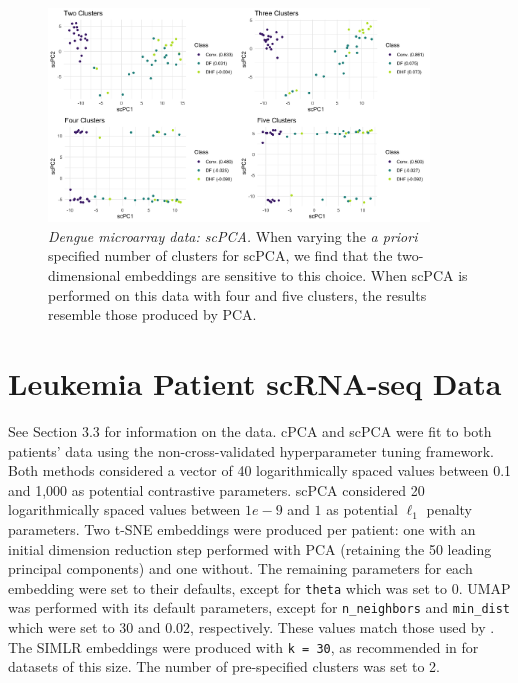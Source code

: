 \documentclass{article}
\begin{document}
\begin{figure}[!htbp]
    \centering
    \includegraphics[width=0.9\textwidth]{figures/dengue_scpca_centers}
    \caption{
    {\em Dengue microarray data: scPCA.}
    When varying the \textit{a priori} specified number of clusters for scPCA, we find that the two-dimensional embeddings are sensitive to this choice. When scPCA is performed on this data with four and five clusters, the results resemble those produced by PCA.}
    \label{fig:dengue_scpca_centers}
\end{figure}

\FloatBarrier

\newpage

\section{Leukemia Patient scRNA-seq Data}\label{sup_aml}

See Section 3.3 %
for information on the data. cPCA and scPCA were fit to both patients' data using the non-cross-validated hyperparameter tuning framework. Both methods considered a vector of 40 logarithmically spaced values between 0.1 and 1,000 as potential contrastive parameters. scPCA considered 20 logarithmically spaced values between $1e-9$ and $1$ as potential $\ell_1$ penalty parameters. Two t-SNE embeddings were produced per patient: one with an initial dimension reduction step performed with PCA (retaining the 50 leading principal components) and one without. The remaining parameters for each embedding were set to their defaults, except for \texttt{theta} which was set to 0. UMAP was performed with its default parameters, except for \texttt{n\_neighbors} and \texttt{min\_dist} which were set to 30 and 0.02, respectively. These values match those used by \citet{Becht2019}. The SIMLR embeddings were produced with \texttt{k = 30}, as recommended in \citet{Wang2017} for datasets of this size. The number of pre-specified clusters was set to 2.
\end{document}
